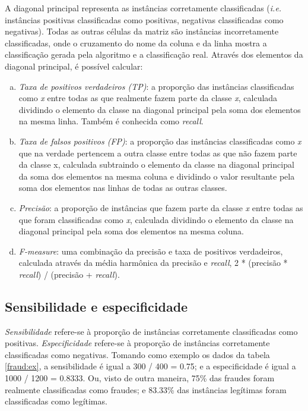A diagonal principal representa as instâncias corretamente classificadas (\emph{i.e.} instâncias positivas classificadas como positivas, negativas classificadas como negativas). Todas as outras células da matriz são instâncias incorretamente classificadas, onde o cruzamento do nome da coluna e da linha mostra a classificação gerada pela algoritmo e a classificação real. Através dos elementos da diagonal principal, é possível calcular:

\begin{enumerate}[a)]
    \item \emph{Taxa de positivos verdadeiros (TP)}: a proporção das instâncias classificadas como \emph{x} entre todas as que realmente fazem parte da classe \emph{x}, calculada dividindo o elemento da classe na diagonal principal pela soma dos elementos na mesma linha. Também é conhecida como \emph{recall}.
    \item \emph{Taxa de falsos positivos (FP)}: a proporção das instâncias classificadas como \emph{x} que na verdade pertencem a outra classe entre todas as que não fazem parte da classe {x}, calculada subtraindo o elemento da classe na diagonal principal da soma dos elementos na mesma coluna e dividindo o valor resultante pela soma dos elementos nas linhas de todas as outras classes.
    \item \emph{Precisão}: a proporção de instâncias que fazem parte da classe \emph{x} entre todas as que foram classificadas como \emph{x}, calculada dividindo o elemento da classe na diagonal principal pela soma dos elementos na mesma coluna.
    \item \emph{\emph{F-measure}}: uma combinação da precisão e taxa de positivos verdadeiros, calculada através da média harmônica da precisão e \emph{recall}, 2 * (precisão * \emph{recall}) / (precisão + \emph{recall}).
\end{enumerate}

\subsection{Sensibilidade e especificidade}

\emph{Sensibilidade} refere-se à proporção de instâncias corretamente classificadas como positivas. \emph{Especificidade} refere-se à proporção de instâncias corretamente classificadas como negativas. Tomando como exemplo os dados da tabela \ref{fraud:ex}, a sensibilidade é igual a 300 / 400 = 0.75; e a especificidade é igual a 1000 / 1200 = 0.8333. Ou, visto de outra maneira, 75\% das fraudes foram realmente classificadas como fraudes; e 83.33\% das instâncias legítimas foram classificadas como legítimas.

